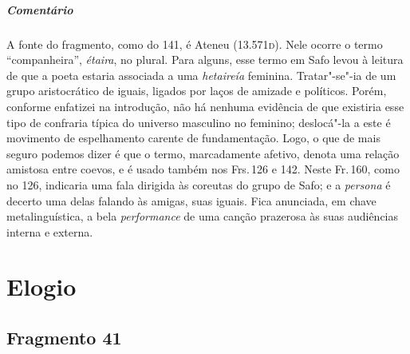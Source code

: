 \medskip

\paragraph{Comentário} A fonte do fragmento, como do 141, é Ateneu (13.571\textsc{d}). Nele ocorre o termo ``companheira'', \emph{étaira}, no plural.
Para alguns, esse termo em Safo levou à leitura de que a poeta estaria associada a uma \emph{hetaireía} feminina. Tratar"-se"-ia de um grupo aristocrático de iguais, ligados por laços de amizade e políticos. Porém, conforme enfatizei na introdução, não há nenhuma evidência de que existiria esse tipo de confraria típica do universo masculino no feminino; deslocá"-la a este é movimento de espelhamento carente de fundamentação. Logo, o que de mais seguro podemos dizer é que o termo, marcadamente afetivo, denota uma relação amistosa entre coevos, e é usado também nos Frs.\,126 e 142. Neste Fr.\,160, como no 126, indicaria uma fala dirigida às coreutas do grupo de Safo; e a \emph{persona} é decerto uma delas falando às amigas, suas iguais. Fica anunciada, em chave metalinguística, a bela \emph{performance}
de uma canção prazerosa às suas audiências interna e externa.

\begin{argumento}
\end{argumento}

\chapter{Elogio}

\section{Fragmento 41}

